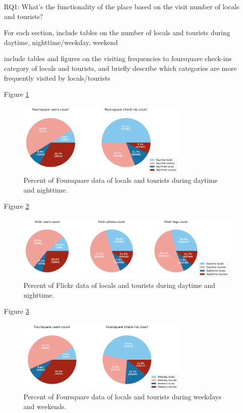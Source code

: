 \documentclass{article}
\begin{document}
RQ1: What’s the functionality of the place based on the visit number of locals and tourists?

For each section,
include tables on the number of locals and tourists during daytime, nighttime/weekday, weekend

include tables and figures on the visiting frequencies to foursquare check-ins category of locals and tourists, and briefly describe which categories are more frequently visited by locals/tourists


Figure \ref{fig:foursquare_day_count_pie}
\begin{figure}
\centering
\includegraphics[width=0.75\textwidth]{figures/foursquare_day_count_pie.png}
\caption{\label{fig:foursquare_day_count_pie}Percent of Foursquare data of locals and tourists during daytime and nighttime.}
\end{figure}

Figure \ref{fig:flickr_day_count_pie}
\begin{figure}
\centering
\includegraphics[width=1.13\textwidth]{figures/flickr_day_count_pie.png}
\caption{\label{fig:flickr_day_count_pie}Percent of Flickr data of locals and tourists during daytime and nighttime.}
\end{figure}


Figure \ref{fig:foursquare_week_count_pie}
\begin{figure}
\centering
\includegraphics[width=0.75\textwidth]{figures/foursquare_week_count_pie.png}
\caption{\label{fig:foursquare_week_count_pie}Percent of Foursquare data of locals and tourists during weekdays and weekends.}
\end{figure}
\end{document}
